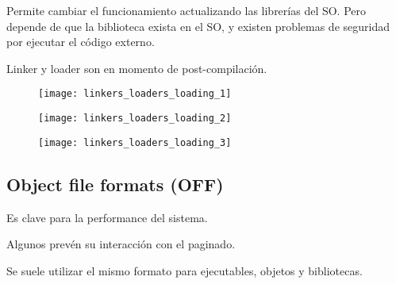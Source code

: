 \documentclass[a4paper, twoside]{article}
\begin{document}
Permite cambiar el funcionamiento actualizando las librerías del SO. Pero depende de que la biblioteca exista en el SO, y existen problemas de seguridad por ejecutar el código externo.

Linker y loader son en momento de post-compilación.

\begin{figure}[H]
	\centering
	\texttt{[image: linkers\_loaders\_loading\_1]}
	\label{fig:linkers_loaders_loading_1}
\end{figure}

\begin{figure}[H]
	\centering
	\texttt{[image: linkers\_loaders\_loading\_2]}
	\label{fig:linkers_loaders_loading_2}
\end{figure}

\begin{figure}[H]
	\centering
	\texttt{[image: linkers\_loaders\_loading\_3]}
	\label{fig:linkers_loaders_loading_3}
\end{figure}

\subsection{Object file formats (OFF)}
Es clave para la performance del sistema.

Algunos prevén su interacción con el paginado.

Se suele utilizar el mismo formato para ejecutables, objetos y bibliotecas.
\end{document}
